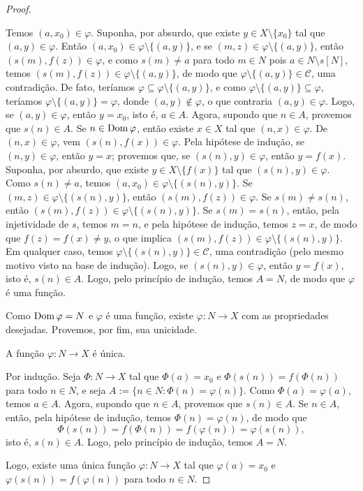 \begin{proof}
\begin{midproof}
            Temos $(a, x_0) \in \varphi$. Suponha, por absurdo, que existe $y \in X \setminus \{x_0 \}$ tal que $(a, y) \in \varphi$. Então $(a, x_0) \in \varphi \setminus \{(a,y)\}$, e se $(m,z) \in \varphi \setminus \{(a,y)\}$, então $(s(m), f(z)) \in \varphi$, e como $s(m) \neq a$ para todo $m \in N$ pois $a \in N \setminus s[N]$, temos $(s(m), f(z)) \in \varphi \setminus \{(a,y)\}$, de modo que $\varphi \setminus \{(a,y)\} \in \mathcal{C}$, uma contradição. De fato, teríamos $\varphi \subseteq \varphi \setminus \{(a,y)\}$, e como $\varphi \setminus \{(a,y)\} \subseteq \varphi$, teríamos $\varphi \setminus \{(a,y)\} = \varphi$, donde $(a,y) \notin \varphi$, o que contraria $(a,y) \in \varphi$. Logo, se $(a,y) \in \varphi$, então $y=x_0$, isto é, $a \in A$. Agora, supondo que $n \in A$, provemos que $s(n) \in A$. Se $n \in \operatorname{Dom} \varphi$, então existe $x \in X$ tal que $(n,x) \in \varphi$. De $(n,x) \in \varphi$, vem $(s(n),f(x)) \in \varphi$. Pela hipótese de indução, se $(n,y) \in \varphi$, então $y=x$; provemos que, se $(s(n),y) \in \varphi$, então $y=f(x)$. Suponha, por absurdo, que existe $y \in X \setminus \{f(x) \}$ tal que $(s(n),y) \in \varphi$. Como $s(n) \neq a$, temos $(a,x_0) \in \varphi \setminus \{(s(n),y)\}$. Se $(m,z) \in \varphi \setminus \{(s(n),y)\}$, então $(s(m),f(z)) \in \varphi$. Se $s(m) \neq s(n)$, então $(s(m), f(z)) \in \varphi \setminus \{(s(n),y)\}$. Se $s(m) = s(n)$, então, pela injetividade de $s$, temos $m=n$, e pela hipótese de indução, temos $z=x$, de modo que $f(z) = f(x) \neq y$, o que implica $(s(m), f(z)) \in \varphi \setminus \{(s(n),y)\}$. Em qualquer caso, temos $\varphi \setminus \{(s(n),y)\} \in \mathcal{C}$, uma contradição (pelo mesmo motivo visto na base de indução). Logo, se $(s(n),y) \in \varphi$, então $y=f(x)$, isto é, $s(n) \in A$. Logo, pelo princípio de indução, temos $A = N$, de modo que $\varphi$ é uma função. \whiteproof
        \end{midproof}
    Como $\operatorname{Dom} \varphi = N$ e $\varphi$ é uma função, existe $\varphi: N \to X$ com as propriedades desejadas. Provemos, por fim, sua unicidade.
        \begin{claim}
            A função $\varphi : N \to X$ é única.
        \end{claim}
        \begin{midproof}
            Por indução. Seja $\Phi : N \to X$ tal que $\Phi(a) = x_0$ e $\Phi(s(n)) = f(\Phi(n))$ para todo $n \in N$, e seja $A := \{ n \in N : \Phi(n) = \varphi(n)\}$. Como $\Phi(a) = \varphi(a)$, temos $a \in A$. Agora, supondo que $n \in A$, provemos que $s(n) \in A$. Se $n \in A$, então, pela hipótese de indução, temos $\Phi(n) = \varphi(n)$, de modo que
                \[
                    \Phi(s(n)) = f(\Phi(n)) = f(\varphi(n)) = \varphi(s(n)),
                \]
            isto é, $s(n) \in A$. Logo, pelo princípio de indução, temos $A = N$. \whiteproof
        \end{midproof}
    Logo, existe uma única função $\varphi: N \to X$ tal que $\varphi(a) = x_0$ e $\varphi(s(n)) = f(\varphi(n))$ para todo $n \in N$. \blackproof
\end{proof}

